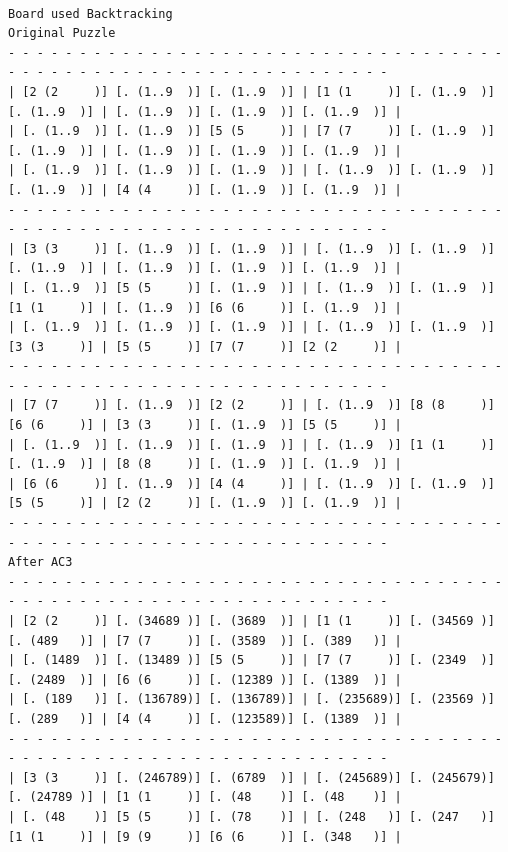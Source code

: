 \documentclass{article}
\begin{document}
\begin{small}
\begin{verbatim}

Board used Backtracking
Original Puzzle
- - - - - - - - - - - - - - - - - - - - - - - - - - - - - - - - - - - - - - - - - - - - - - - - - - - - - - - - - - - - - -
| [2 (2     )] [. (1..9  )] [. (1..9  )] | [1 (1     )] [. (1..9  )] [. (1..9  )] | [. (1..9  )] [. (1..9  )] [. (1..9  )] |
| [. (1..9  )] [. (1..9  )] [5 (5     )] | [7 (7     )] [. (1..9  )] [. (1..9  )] | [. (1..9  )] [. (1..9  )] [. (1..9  )] |
| [. (1..9  )] [. (1..9  )] [. (1..9  )] | [. (1..9  )] [. (1..9  )] [. (1..9  )] | [4 (4     )] [. (1..9  )] [. (1..9  )] |
- - - - - - - - - - - - - - - - - - - - - - - - - - - - - - - - - - - - - - - - - - - - - - - - - - - - - - - - - - - - - -
| [3 (3     )] [. (1..9  )] [. (1..9  )] | [. (1..9  )] [. (1..9  )] [. (1..9  )] | [. (1..9  )] [. (1..9  )] [. (1..9  )] |
| [. (1..9  )] [5 (5     )] [. (1..9  )] | [. (1..9  )] [. (1..9  )] [1 (1     )] | [. (1..9  )] [6 (6     )] [. (1..9  )] |
| [. (1..9  )] [. (1..9  )] [. (1..9  )] | [. (1..9  )] [. (1..9  )] [3 (3     )] | [5 (5     )] [7 (7     )] [2 (2     )] |
- - - - - - - - - - - - - - - - - - - - - - - - - - - - - - - - - - - - - - - - - - - - - - - - - - - - - - - - - - - - - - 
| [7 (7     )] [. (1..9  )] [2 (2     )] | [. (1..9  )] [8 (8     )] [6 (6     )] | [3 (3     )] [. (1..9  )] [5 (5     )] | 
| [. (1..9  )] [. (1..9  )] [. (1..9  )] | [. (1..9  )] [1 (1     )] [. (1..9  )] | [8 (8     )] [. (1..9  )] [. (1..9  )] |
| [6 (6     )] [. (1..9  )] [4 (4     )] | [. (1..9  )] [. (1..9  )] [5 (5     )] | [2 (2     )] [. (1..9  )] [. (1..9  )] |
- - - - - - - - - - - - - - - - - - - - - - - - - - - - - - - - - - - - - - - - - - - - - - - - - - - - - - - - - - - - - -
After AC3
- - - - - - - - - - - - - - - - - - - - - - - - - - - - - - - - - - - - - - - - - - - - - - - - - - - - - - - - - - - - - -
| [2 (2     )] [. (34689 )] [. (3689  )] | [1 (1     )] [. (34569 )] [. (489   )] | [7 (7     )] [. (3589  )] [. (389   )] |
| [. (1489  )] [. (13489 )] [5 (5     )] | [7 (7     )] [. (2349  )] [. (2489  )] | [6 (6     )] [. (12389 )] [. (1389  )] | 
| [. (189   )] [. (136789)] [. (136789)] | [. (235689)] [. (23569 )] [. (289   )] | [4 (4     )] [. (123589)] [. (1389  )] |
- - - - - - - - - - - - - - - - - - - - - - - - - - - - - - - - - - - - - - - - - - - - - - - - - - - - - - - - - - - - - -
| [3 (3     )] [. (246789)] [. (6789  )] | [. (245689)] [. (245679)] [. (24789 )] | [1 (1     )] [. (48    )] [. (48    )] |
| [. (48    )] [5 (5     )] [. (78    )] | [. (248   )] [. (247   )] [1 (1     )] | [9 (9     )] [6 (6     )] [. (348   )] | 

\end{verbatim}
\end{small}
\end{document}
